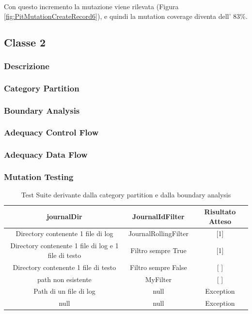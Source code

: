 \documentclass[12pt, a4paper]{article}
\begin{document}
Con questo incremento la mutazione viene rilevata (Figura \ref{fig:PitMutationCreateRecord6}), e quindi 
la mutation coverage diventa dell' 83\%. 

\subsection{Classe 2}
\subsubsection{Descrizione}
\subsubsection{Category Partition}
\subsubsection{Boundary Analysis}
\subsubsection{Adequacy Control Flow}
\subsubsection{Adequacy Data Flow}
\subsubsection{Mutation Testing}













\begin{table}[ht]
  \centering
  \caption[Journal: Test Suite - Category Partition]{Test Suite derivante dalla category partition e dalla boundary analysis}
  \begin{tabular}{|c|c|c|}
  \hline
  journalDir & JournalIdFilter & Risultato Atteso \\
  \hline
  {Directory contenente 1 file di log} & JournalRollingFilter & [1] \\
  {Directory contenente 1 file di log e 1 file di testo} & Filtro sempre True & [1] \\
  {Directory contenente 1 file di testo} & Filtro sempre False & [ ] \\
  {path non esistente} & MyFilter & [ ] \\
  {Path di un file di log} & null & Exception \\
  null & null & Exception \\
  \hline
  \end{tabular}
  \label{tab:categoryPartition1ListJournalIds}
\end{table}
\end{document}
